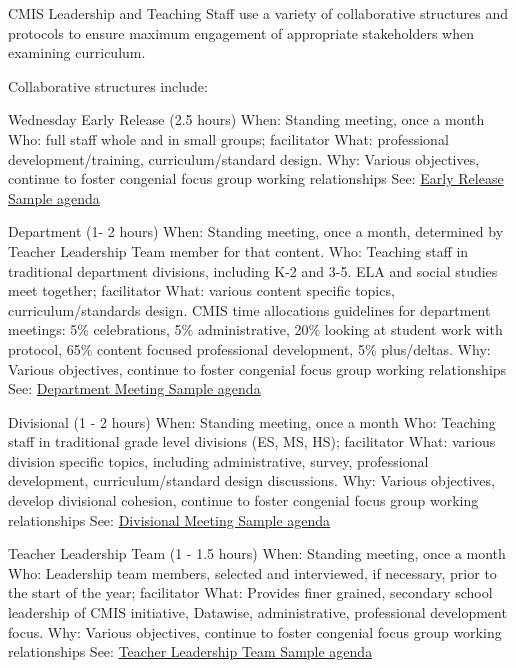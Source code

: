 \documentclass{report}
\begin{document}
\begin{findings}

CMIS Leadership and Teaching Staff use a variety of collaborative structures and protocols to ensure maximum engagement of appropriate stakeholders when examining curriculum. 

Collaborative structures include: 

Wednesday Early Release (2.5 hours)
When: Standing meeting, once a month 
Who: full staff whole and in small groups; facilitator 
What: professional development/training, curriculum/standard design. 
Why: Various objectives, continue to foster congenial focus group working relationships
See: \href{https://docs.google.com/a/cmis.ac.th/document/d/1RoLU6YF794M-w835lARCN-PAiZ18xGDlbtLd93Qvkqc/edit?usp=sharing}{Early Release Sample agenda}

Department (1- 2 hours)
When: Standing meeting, once a month, determined by Teacher Leadership Team member for that content. 
Who: Teaching staff in traditional department divisions, including K-2 and 3-5. ELA and social studies meet together; facilitator 
What: various content specific topics, curriculum/standards design. CMIS time allocations guidelines for department meetings: 5\% celebrations, 5\% administrative, 20\% looking at student work with protocol, 65\% content focused professional development, 5\% plus/deltas. 
Why: Various objectives, continue to foster congenial focus group working relationships
See: \href{https://docs.google.com/a/cmis.ac.th/document/d/1umDrBbwhE8UFXVo4s6ytS6Ykxf4uJRs0MFSvgQewjys/edit?usp=sharing}{Department Meeting Sample agenda}

Divisional (1 - 2 hours) 
When: Standing meeting, once a month 
Who: Teaching staff in traditional grade level divisions (ES, MS, HS); facilitator 
What: various division specific topics, including administrative, survey, professional development, curriculum/standard design discussions. 
Why: Various objectives, develop divisional cohesion, continue to foster congenial focus group working relationships
See: \href{https://docs.google.com/a/cmis.ac.th/document/d/1xT0xZBYBEuu4zlg_DwGHZVET8WsdoTLphRXPJUNN6_o/edit?usp=sharing}{Divisional Meeting Sample agenda} 

Teacher Leadership Team (1 - 1.5 hours)
When: Standing meeting, once a month
Who: Leadership team members, selected and interviewed, if necessary, prior to the start of the year; facilitator 
What: Provides finer grained, secondary school leadership of CMIS initiative, Datawise, administrative, professional development focus. 
Why: Various objectives, continue to foster congenial focus group working relationships
See: \href{https://docs.google.com/a/cmis.ac.th/document/d/1M88mpMIEkx65JUSplvQMWfN6l8ur3fwpKrgzN97Hq8g/edit?usp=sharing}{Teacher Leadership Team Sample agenda} 


\end{findings}
\end{document}
